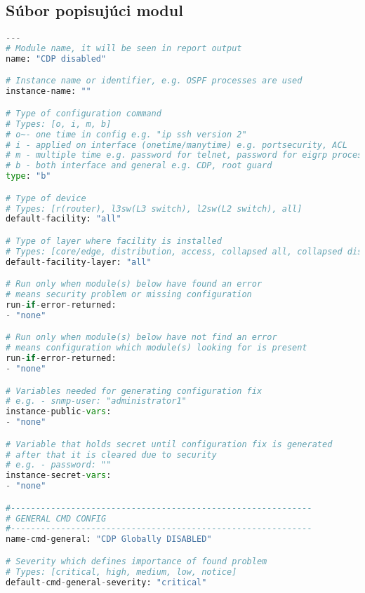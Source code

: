 \subsection{Súbor popisujúci modul}

\begin{lstlisting}[frame=single,numbers=right,caption={Konfiguračný súbor cdp\_module.yaml ktorý pobsahuje informácie na nájdenie problému, jeho odstránenie a informácie do správy},label=lst:lldp,basicstyle=\ttfamily\small, keywordstyle=\color{black},language=python,breaklines=true]
---
# Module name, it will be seen in report output
name: "CDP disabled"

# Instance name or identifier, e.g. OSPF processes are used
instance-name: ""

# Type of configuration command
# Types: [o, i, m, b]
# o~- one time in config e.g. "ip ssh version 2"
# i - applied on interface (onetime/manytime) e.g. portsecurity, ACL
# m - multiple time e.g. password for telnet, password for eigrp processes
# b - both interface and general e.g. CDP, root guard
type: "b"

# Type of device
# Types: [r(router), l3sw(L3 switch), l2sw(L2 switch), all]
default-facility: "all"

# Type of layer where facility is installed
# Types: [core/edge, distribution, access, collapsed all, collapsed distribution access, collapsed core distribution, all]
default-facility-layer: "all"

# Run only when module(s) below have found an error
# means security problem or missing configuration
run-if-error-returned: 
- "none"

# Run only when module(s) below have not find an error
# means configuration which module(s) looking for is present
run-if-error-returned: 
- "none"

# Variables needed for generating configuration fix
# e.g. - snmp-user: "administrator1"
instance-public-vars:
- "none"

# Variable that holds secret until configuration fix is generated
# after that it is cleared due to security
# e.g. - password: "" 
instance-secret-vars:
- "none"

#------------------------------------------------------------
# GENERAL CMD CONFIG
#------------------------------------------------------------
name-cmd-general: "CDP Globally DISABLED"

# Severity which defines importance of found problem 
# Types: [critical, high, medium, low, notice]
default-cmd-general-severity: "critical"


\end{lstlisting}
